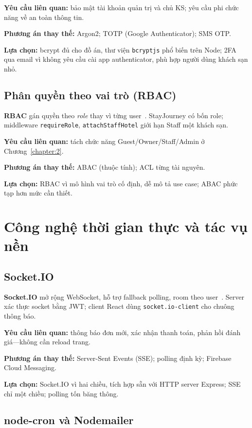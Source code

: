 \documentclass[../DoAn.tex]{subfiles}
\begin{document}
\textbf{Yêu cầu liên quan:} bảo mật tài khoản quản trị và chủ KS; yêu cầu phi chức năng về an toàn thông tin.

\textbf{Phương án thay thế:} Argon2; TOTP (Google Authenticator); SMS OTP.

\textbf{Lựa chọn:} bcrypt đủ cho đồ án, thư viện \texttt{bcryptjs} phổ biến trên Node; 2FA qua email vì không yêu cầu cài app authenticator, phù hợp người dùng khách sạn nhỏ.

\subsection{Phân quyền theo vai trò (RBAC)}

\textbf{RBAC} gán quyền theo \textit{role} thay vì từng user~\cite{sandhu1996rbac}. StayJourney có bốn role; middleware \texttt{requireRole}, \texttt{attachStaffHotel} giới hạn Staff một khách sạn.

\textbf{Yêu cầu liên quan:} tách chức năng Guest/Owner/Staff/Admin ở Chương~\ref{chapter:2}.

\textbf{Phương án thay thế:} ABAC (thuộc tính); ACL từng tài nguyên.

\textbf{Lựa chọn:} RBAC vì mô hình vai trò cố định, dễ mô tả use case; ABAC phức tạp hơn mức cần thiết.

\section{Công nghệ thời gian thực và tác vụ nền}
\label{section:3.6}

\subsection{Socket.IO}

\textbf{Socket.IO} mở rộng WebSocket, hỗ trợ fallback polling, room theo user~\cite{socketio2024}. Server xác thực socket bằng JWT; client React dùng \texttt{socket.io-client} cho chuông thông báo.

\textbf{Yêu cầu liên quan:} thông báo đơn mới, xác nhận thanh toán, phản hồi đánh giá---không cần reload trang.

\textbf{Phương án thay thế:} Server-Sent Events (SSE); polling định kỳ; Firebase Cloud Messaging.

\textbf{Lựa chọn:} Socket.IO vì hai chiều, tích hợp sẵn với HTTP server Express; SSE chỉ một chiều; polling tốn băng thông.

\subsection{node-cron và Nodemailer}
\end{document}
